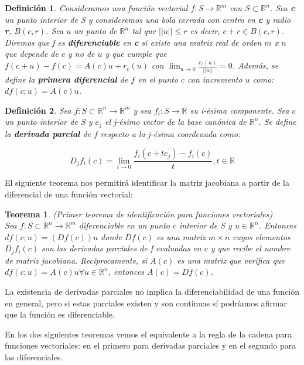 \documentclass{article}
\theoremstyle{theorem-style}  %
\newtheorem{theorem}{Teorema}[section]  %
\theoremstyle{definition-style}
\newtheorem{definition}{Definición}[section]
\theoremstyle{example-style}
\theoremstyle{exercise-style}
\begin{document}
	\begin{definition}
		Consideramos una función vectorial $f: S \rightarrow \mathbb{R}^m$ con $S\subset \mathbb{R}^n$. Sea \textbf{c} un punto interior de S y consideremos una bola cerrada con centro en \textbf{c} y radio \textbf{r}, $B(c,r)$. Sea $u$ un punto de $\mathbb{R}^n$ tal que $||u||\leq r$ es decir, $c+r \in B(c,r)$.\\ 
		Diremos que f es \textbf{diferenciable} en \textbf{c} si existe una matriz real de orden $m$ x $n$ que depende de $c$ y no de $u$ y que cumple que $f(c+u)-f(c) = A(c)u + r_c(u)$ con $\lim_{u\to0} \frac{r_c(u)}{||u||} = 0$. Además, se define la \textbf{primera diferencial} de $f$ en el punto $c$ con incremento $u$ como: $df(c;u)=A(c)u$.
	\end{definition}
	
	\begin{definition}
		
		Sea $f: S\subset \mathbb{R}^n \rightarrow \mathbb{R}^m$ y sea $f_i: S \rightarrow \mathbb{R}$ su i-ésima componente. Sea $c$ un punto interior de S y $e_j$ el j-ésimo vector de la base canónica de $\mathbb{R}^n$. Se define la \textbf{derivada parcial} de $f$ respecto a la j-ésima coordenada como: 
		
		$$ D_jf_i(c) = \lim_{t\to0} \frac{f_i(c + te_j ) - f_i(c)}{t}, t\in \mathbb{R} $$  
	\end{definition}
	
	El siguiente teorema nos permitirá identificar la matriz jacobiana a partir de la diferencial de una función vectorial:
	
	\begin{theorem} (Primer teorema de identificación para funciones vectoriales)\\
		Sea $f: S\subset \mathbb{R}^n \rightarrow \mathbb{R}^m$ diferenciable en un punto $c$ interior de S y $u  \in \mathbb{R}^n$. Entonces $df(c;u)=(Df(c))u$ donde $Df(c)$ es una matriz $m \times n$ cuyos elementos $D_jf_i(c)$ son las derivadas parciales de f evaluadas en $c$ y que recibe el nombre de matriz jacobiana. Recíprocamente, si $A(c)$ es una matriz que verifica que $df(c;u)=A(c)u \forall u\in \mathbb{R}^n$, entonces $A(c) = Df(c)$. 
	\end{theorem}
	
	La existencia de derivadas parciales no implica la diferenciabilidad de una función en general, pero si estas parciales existen y son continuas sí podríamos afirmar que la función es diferenciable.
	
	En los dos siguientes teoremas vemos el equivalente a la regla de la cadena para funciones vectoriales: en el primero para derivadas parciales y en el segundo para las diferenciales.
	
\end{document}
